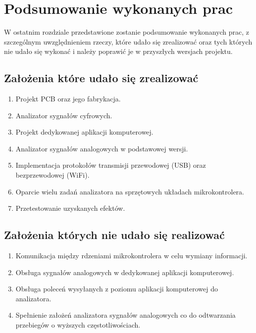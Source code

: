 \section{Podsumowanie wykonanych prac}
W ostatnim rozdziale przedstawione zostanie podsumowanie wykonanych prac, z szczególnym uwzględnieniem rzeczy,
które udało się zrealizować oraz tych których nie udało się wykonać i należy poprawić je w przyszłych wersjach projektu.

\subsection{Założenia które udało się zrealizować}
\begin{enumerate}
    \item Projekt PCB oraz jego fabrykacja.
    \item Analizator sygnałów cyfrowych.
    \item Projekt dedykowanej aplikacji komputerowej.
    \item Analizator sygnałów analogowych w podstawowej wersji.
    \item Implementacja protokołów transmisji przewodowej (USB) oraz bezprzewodowej (WiFi).
    \item Oparcie wielu zadań analizatora na sprzętowych układach mikrokontrolera.
    \item Przetestowanie uzyskanych efektów.
\end{enumerate}

\subsection{Założenia których nie udało się realizować}
\begin{enumerate}
    \item Komunikacja między rdzeniami mikrokontrolera w celu wymiany informacji.
    \item Obsługa sygnałów analogowych w dedykowanej aplikacji komputerowej.
    \item Obsługa poleceń wysyłanych z poziomu aplikacji komputerowej do analizatora.
    \item Spełnienie założeń analizatora sygnałów analogowych co do odtwarzania przebiegów o wyższych częstotliwościach.
\end{enumerate}